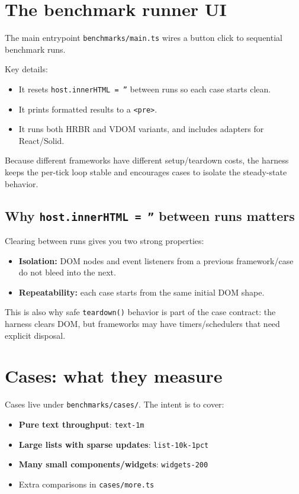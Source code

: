 \section{The benchmark runner UI}

The main entrypoint \texttt{benchmarks/main.ts} wires a button click to sequential benchmark runs.

Key details:

\begin{itemize}
\item It resets \texttt{host.innerHTML = ''} between runs so each case starts clean.
\item It prints formatted results to a \texttt{<pre>}.
\item It runs both HRBR and VDOM variants, and includes adapters for React/Solid.
\end{itemize}

Because different frameworks have different setup/teardown costs, the harness keeps the per-tick loop stable and encourages cases to isolate the steady-state behavior.

\subsection{Why \texttt{host.innerHTML = ''} between runs matters}

Clearing between runs gives you two strong properties:

\begin{itemize}
\item \textbf{Isolation:} DOM nodes and event listeners from a previous framework/case do not bleed into the next.
\item \textbf{Repeatability:} each case starts from the same initial DOM shape.
\end{itemize}

This is also why safe \texttt{teardown()} behavior is part of the case contract: the harness clears DOM, but frameworks may have timers/schedulers that need explicit disposal.

\section{Cases: what they measure}

Cases live under \texttt{benchmarks/cases/}.
The intent is to cover:

\begin{itemize}
\item \textbf{Pure text throughput}: \texttt{text-1m}
\item \textbf{Large lists with sparse updates}: \texttt{list-10k-1pct}
\item \textbf{Many small components/widgets}: \texttt{widgets-200}
\item Extra comparisons in \texttt{cases/more.ts}
\end{itemize}

